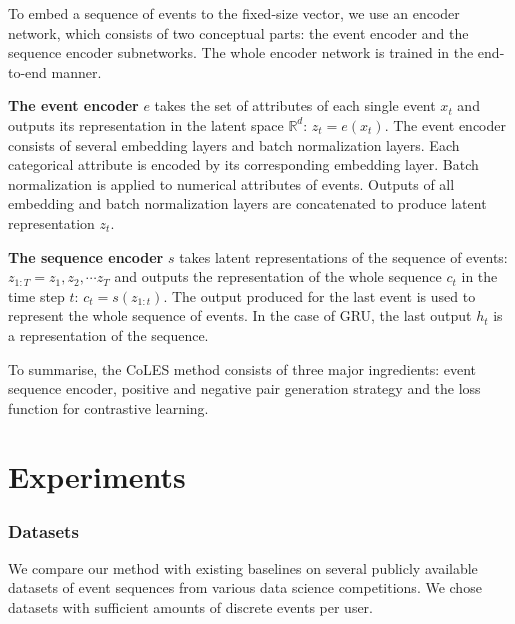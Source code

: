 \documentclass[sigconf, anonymous]{acmart}
\newcommand{\R}{\mathbb{R}}
\begin{document}
To embed a sequence of events to the fixed-size vector, we use an encoder network, which consists of two conceptual parts: the event encoder and the sequence encoder subnetworks. The whole encoder network is trained in the end-to-end manner.

\textbf{The event encoder} $e$ takes the set of attributes of each single event $x_t$ and outputs its representation in the latent space $\R^d$: $z_t = e(x_t)$. The event encoder consists of several embedding layers and batch normalization layers. Each categorical attribute is encoded by its corresponding embedding layer. Batch normalization is applied to numerical attributes of events. Outputs of all embedding and batch normalization layers are concatenated to produce latent representation $z_t$.

\textbf{The sequence encoder} $s$ takes latent representations of the sequence of events: $ z_{1:T} = z_1, z_2, \cdots z_T $ and outputs the representation of the whole sequence $c_t$ in the time step $t$: $c_t = s(z_{1:t})$.  The output produced for the last event is used to represent the whole sequence of events. In the case of GRU, the last output $h_t$ is a representation of the sequence.


To summarise, the CoLES method consists of three major ingredients: event sequence encoder, positive and negative pair generation strategy and the loss function for contrastive learning.


\section{Experiments} \label{sec-exp}

\subsubsection{Datasets}

We compare our method with existing baselines on several publicly available datasets of event sequences from various data science competitions. We chose datasets with sufficient amounts of discrete events per user.
\end{document}
